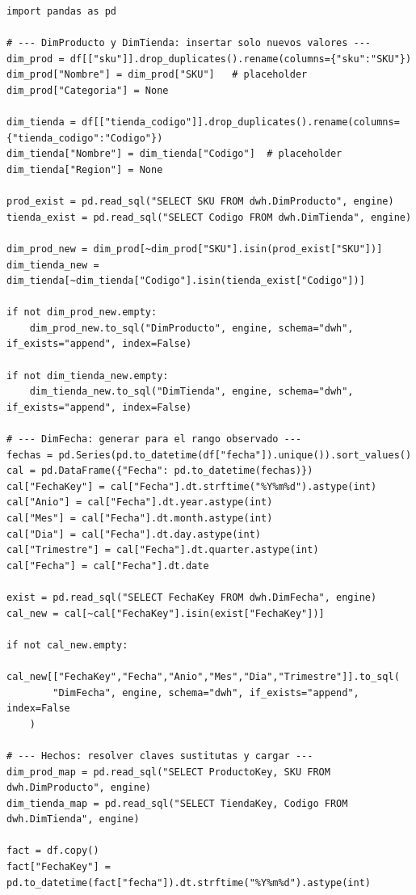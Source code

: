 \documentclass[12pt]{article}
\begin{document}
\begin{lstlisting}[style=python, caption={Carga de DimProducto, DimTienda, DimFecha y FactVentas}]
import pandas as pd

# --- DimProducto y DimTienda: insertar solo nuevos valores ---
dim_prod = df[["sku"]].drop_duplicates().rename(columns={"sku":"SKU"})
dim_prod["Nombre"] = dim_prod["SKU"]   # placeholder
dim_prod["Categoria"] = None

dim_tienda = df[["tienda_codigo"]].drop_duplicates().rename(columns={"tienda_codigo":"Codigo"})
dim_tienda["Nombre"] = dim_tienda["Codigo"]  # placeholder
dim_tienda["Region"] = None

prod_exist = pd.read_sql("SELECT SKU FROM dwh.DimProducto", engine)
tienda_exist = pd.read_sql("SELECT Codigo FROM dwh.DimTienda", engine)

dim_prod_new = dim_prod[~dim_prod["SKU"].isin(prod_exist["SKU"])]
dim_tienda_new = dim_tienda[~dim_tienda["Codigo"].isin(tienda_exist["Codigo"])]

if not dim_prod_new.empty:
    dim_prod_new.to_sql("DimProducto", engine, schema="dwh", if_exists="append", index=False)

if not dim_tienda_new.empty:
    dim_tienda_new.to_sql("DimTienda", engine, schema="dwh", if_exists="append", index=False)

# --- DimFecha: generar para el rango observado ---
fechas = pd.Series(pd.to_datetime(df["fecha"]).unique()).sort_values()
cal = pd.DataFrame({"Fecha": pd.to_datetime(fechas)})
cal["FechaKey"] = cal["Fecha"].dt.strftime("%Y%m%d").astype(int)
cal["Anio"] = cal["Fecha"].dt.year.astype(int)
cal["Mes"] = cal["Fecha"].dt.month.astype(int)
cal["Dia"] = cal["Fecha"].dt.day.astype(int)
cal["Trimestre"] = cal["Fecha"].dt.quarter.astype(int)
cal["Fecha"] = cal["Fecha"].dt.date

exist = pd.read_sql("SELECT FechaKey FROM dwh.DimFecha", engine)
cal_new = cal[~cal["FechaKey"].isin(exist["FechaKey"])]

if not cal_new.empty:
    cal_new[["FechaKey","Fecha","Anio","Mes","Dia","Trimestre"]].to_sql(
        "DimFecha", engine, schema="dwh", if_exists="append", index=False
    )

# --- Hechos: resolver claves sustitutas y cargar ---
dim_prod_map = pd.read_sql("SELECT ProductoKey, SKU FROM dwh.DimProducto", engine)
dim_tienda_map = pd.read_sql("SELECT TiendaKey, Codigo FROM dwh.DimTienda", engine)

fact = df.copy()
fact["FechaKey"] = pd.to_datetime(fact["fecha"]).dt.strftime("%Y%m%d").astype(int)


\end{lstlisting}
\end{document}
